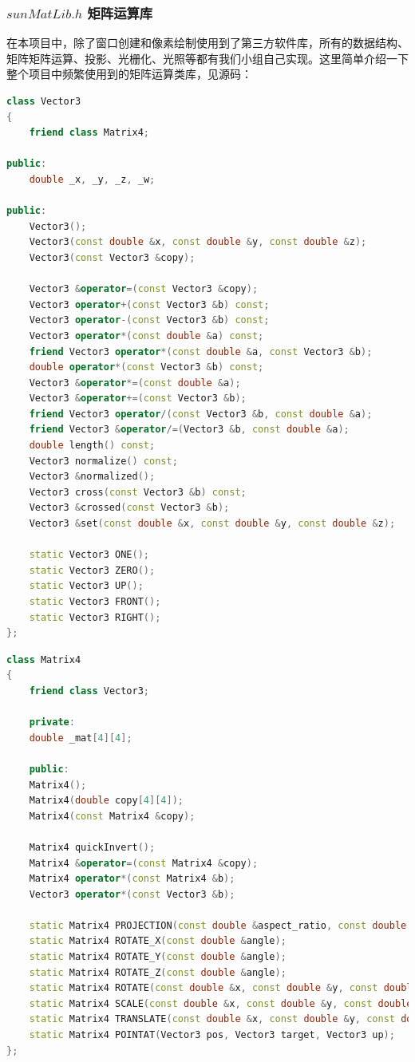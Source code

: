 \documentclass[12pt,oneside,a4paper]{ctexart}
\begin{document}
\subsubsection{$sunMatLib.h$ 矩阵运算库}
在本项目中，除了窗口创建和像素绘制使用到了第三方软件库，所有的数据结构、矩阵矩阵运算、投影、光栅化、光照等都有我们小组自己实现。这里简单介绍一下整个项目中频繁使用到的矩阵运算类库，见源码：
\newline
\begin{lstlisting}[language=c++]
class Vector3
{
	friend class Matrix4;
	
public:
	double _x, _y, _z, _w;
	
public:
	Vector3();
	Vector3(const double &x, const double &y, const double &z);
	Vector3(const Vector3 &copy);
	
	Vector3 &operator=(const Vector3 &copy);
	Vector3 operator+(const Vector3 &b) const;
	Vector3 operator-(const Vector3 &b) const;
	Vector3 operator*(const double &a) const;
	friend Vector3 operator*(const double &a, const Vector3 &b);
	double operator*(const Vector3 &b) const;
	Vector3 &operator*=(const double &a);
	Vector3 &operator+=(const Vector3 &b);
	friend Vector3 operator/(const Vector3 &b, const double &a);
	friend Vector3 &operator/=(Vector3 &b, const double &a);
	double length() const;
	Vector3 normalize() const;
	Vector3 &normalized();
	Vector3 cross(const Vector3 &b) const;
	Vector3 &crossed(const Vector3 &b);
	Vector3 &set(const double &x, const double &y, const double &z);
	
	static Vector3 ONE();
	static Vector3 ZERO();
	static Vector3 UP();
	static Vector3 FRONT();
	static Vector3 RIGHT();
};
\end{lstlisting}
\begin{lstlisting}[language=c++]
class Matrix4
{
	friend class Vector3;

	private:
	double _mat[4][4];

	public:
	Matrix4();
	Matrix4(double copy[4][4]);
	Matrix4(const Matrix4 &copy);

	Matrix4 quickInvert();
	Matrix4 &operator=(const Matrix4 &copy);
	Matrix4 operator*(const Matrix4 &b);
	Vector3 operator*(const Vector3 &b);

	static Matrix4 PROJECTION(const double &aspect_ratio, const double &fov_rad, const double &near_panel, const double &far_panel);
	static Matrix4 ROTATE_X(const double &angle);
	static Matrix4 ROTATE_Y(const double &angle);
	static Matrix4 ROTATE_Z(const double &angle);
	static Matrix4 ROTATE(const double &x, const double &y, const double &z);
	static Matrix4 SCALE(const double &x, const double &y, const double &z);
	static Matrix4 TRANSLATE(const double &x, const double &y, const double &z);
	static Matrix4 POINTAT(Vector3 pos, Vector3 target, Vector3 up);
};
\end{lstlisting}
\end{document}
